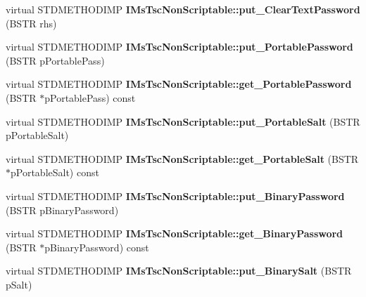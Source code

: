 \begin{DoxyCompactItemize}
virtual S\+T\+D\+M\+E\+T\+H\+O\+D\+I\+MP {\bfseries I\+Ms\+Tsc\+Non\+Scriptable\+::put\+\_\+\+Clear\+Text\+Password} (B\+S\+TR rhs)
\item 
\mbox{\label{class_s_e_a_l_e_d___a64f80bf51c04215c43aa5463d55aa27a}} 
virtual S\+T\+D\+M\+E\+T\+H\+O\+D\+I\+MP {\bfseries I\+Ms\+Tsc\+Non\+Scriptable\+::put\+\_\+\+Portable\+Password} (B\+S\+TR p\+Portable\+Pass)
\item 
\mbox{\label{class_s_e_a_l_e_d___a90fd95b9569f0767af672927f9d60dc4}} 
virtual S\+T\+D\+M\+E\+T\+H\+O\+D\+I\+MP {\bfseries I\+Ms\+Tsc\+Non\+Scriptable\+::get\+\_\+\+Portable\+Password} (B\+S\+TR $\ast$p\+Portable\+Pass) const
\item 
\mbox{\label{class_s_e_a_l_e_d___ad42256a54a8f0e746e46cb1d8bb5d2f9}} 
virtual S\+T\+D\+M\+E\+T\+H\+O\+D\+I\+MP {\bfseries I\+Ms\+Tsc\+Non\+Scriptable\+::put\+\_\+\+Portable\+Salt} (B\+S\+TR p\+Portable\+Salt)
\item 
\mbox{\label{class_s_e_a_l_e_d___aa51b9b08d4caab70173e7a29679048dd}} 
virtual S\+T\+D\+M\+E\+T\+H\+O\+D\+I\+MP {\bfseries I\+Ms\+Tsc\+Non\+Scriptable\+::get\+\_\+\+Portable\+Salt} (B\+S\+TR $\ast$p\+Portable\+Salt) const
\item 
\mbox{\label{class_s_e_a_l_e_d___a077b9007ef32e8cfab9377e346e3380f}} 
virtual S\+T\+D\+M\+E\+T\+H\+O\+D\+I\+MP {\bfseries I\+Ms\+Tsc\+Non\+Scriptable\+::put\+\_\+\+Binary\+Password} (B\+S\+TR p\+Binary\+Password)
\item 
\mbox{\label{class_s_e_a_l_e_d___abdb0a1ded000e446c8ef89fbfdc2e68f}} 
virtual S\+T\+D\+M\+E\+T\+H\+O\+D\+I\+MP {\bfseries I\+Ms\+Tsc\+Non\+Scriptable\+::get\+\_\+\+Binary\+Password} (B\+S\+TR $\ast$p\+Binary\+Password) const
\item 
\mbox{\label{class_s_e_a_l_e_d___aee15e12a676630a02cc106963983f015}} 
virtual S\+T\+D\+M\+E\+T\+H\+O\+D\+I\+MP {\bfseries I\+Ms\+Tsc\+Non\+Scriptable\+::put\+\_\+\+Binary\+Salt} (B\+S\+TR p\+Salt)
\item 
\mbox{\label{class_s_e_a_l_e_d___a3aa0cb3ea286b1511874f921f5304eff}} 

\end{DoxyCompactItemize}
